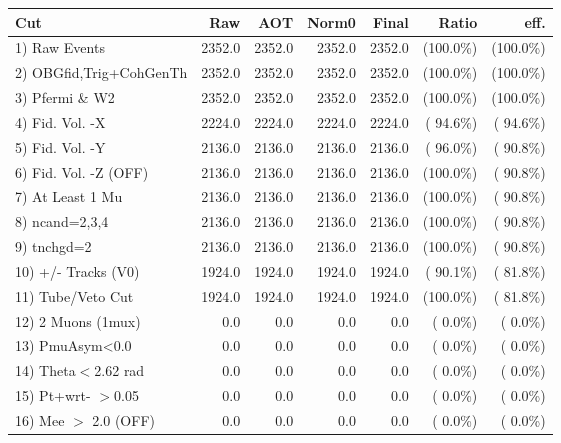  \begin{table}[h!]\centering
 \begin{tabular}{||l||r|r|r|r|r|r||}
 \hline
 \hline
 Cut & Raw & AOT & Norm0 & Final & Ratio & eff.       \\
 \hline
  1) Raw Events           &       2352.0 &       2352.0 &       2352.0 &       2352.0 & (100.0\%) & (100.0\%) \\
  2) OBGfid,Trig+CohGenTh &       2352.0 &       2352.0 &       2352.0 &       2352.0 & (100.0\%) & (100.0\%) \\
  3) Pfermi \& W2         &       2352.0 &       2352.0 &       2352.0 &       2352.0 & (100.0\%) & (100.0\%) \\
  4) Fid. Vol. -X         &       2224.0 &       2224.0 &       2224.0 &       2224.0 & ( 94.6\%) & ( 94.6\%) \\
  5) Fid. Vol. -Y         &       2136.0 &       2136.0 &       2136.0 &       2136.0 & ( 96.0\%) & ( 90.8\%) \\
  6) Fid. Vol. -Z (OFF)   &       2136.0 &       2136.0 &       2136.0 &       2136.0 & (100.0\%) & ( 90.8\%) \\
  7) At Least 1 Mu        &       2136.0 &       2136.0 &       2136.0 &       2136.0 & (100.0\%) & ( 90.8\%) \\
  8) ncand=2,3,4          &       2136.0 &       2136.0 &       2136.0 &       2136.0 & (100.0\%) & ( 90.8\%) \\
  9) tnchgd=2             &       2136.0 &       2136.0 &       2136.0 &       2136.0 & (100.0\%) & ( 90.8\%) \\
 10) +/- Tracks (V0)      &       1924.0 &       1924.0 &       1924.0 &       1924.0 & ( 90.1\%) & ( 81.8\%) \\
 11) Tube/Veto Cut        &       1924.0 &       1924.0 &       1924.0 &       1924.0 & (100.0\%) & ( 81.8\%) \\
 12) 2 Muons (1mux)       &          0.0 &          0.0 &          0.0 &          0.0 & (  0.0\%) & (  0.0\%) \\
 13) PmuAsym<0.0          &          0.0 &          0.0 &          0.0 &          0.0 & (  0.0\%) & (  0.0\%) \\
 14) Theta$<$2.62 rad     &          0.0 &          0.0 &          0.0 &          0.0 & (  0.0\%) & (  0.0\%) \\
 15) Pt+wrt- $>$0.05      &          0.0 &          0.0 &          0.0 &          0.0 & (  0.0\%) & (  0.0\%) \\
 16) Mee $>$ 2.0  (OFF)   &          0.0 &          0.0 &          0.0 &          0.0 & (  0.0\%) & (  0.0\%) \\

\end{tabular}
\end{table}
